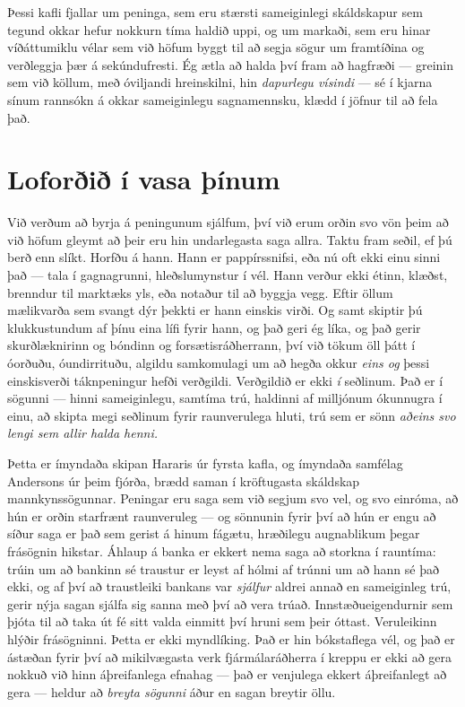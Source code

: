 Þessi kafli fjallar um peninga, sem eru stærsti sameiginlegi skáldskapur sem tegund okkar hefur nokkurn tíma haldið uppi, og um markaði, sem eru hinar víðáttumiklu vélar sem við höfum byggt til að segja sögur um framtíðina og verðleggja þær á sekúndufresti. Ég ætla að halda því fram að hagfræði — greinin sem við köllum, með óviljandi hreinskilni, hin \emph{dapurlegu vísindi} — sé í kjarna sínum rannsókn á okkar sameiginlegu sagnamennsku, klædd í jöfnur til að fela það.

\section*{Loforðið í vasa þínum}

Við verðum að byrja á peningunum sjálfum, því við erum orðin svo vön þeim að við höfum gleymt að þeir eru hin undarlegasta saga allra. Taktu fram seðil, ef þú berð enn slíkt. Horfðu á hann. Hann er pappírssnifsi, eða nú oft ekki einu sinni það — tala í gagnagrunni, hleðslumynstur í vél. Hann verður ekki étinn, klæðst, brenndur til marktæks yls, eða notaður til að byggja vegg. Eftir öllum mælikvarða sem svangt dýr þekkti er hann einskis virði. Og samt skiptir þú klukkustundum af þínu eina lífi fyrir hann, og það geri ég líka, og það gerir skurðlæknirinn og bóndinn og forsætisráðherrann, því við tökum öll þátt í óorðuðu, óundirrituðu, algildu samkomulagi um að hegða okkur \emph{eins og} þessi einskisverði táknpeningur hefði verðgildi. Verðgildið er ekki \emph{í} seðlinum. Það er í sögunni — hinni sameiginlegu, samtíma trú, haldinni af milljónum ókunnugra í einu, að skipta megi seðlinum fyrir raunverulega hluti, trú sem er sönn \emph{aðeins svo lengi sem allir halda henni.}

Þetta er ímyndaða skipan Hararis úr fyrsta kafla, og ímyndaða samfélag Andersons úr þeim fjórða, brædd saman í kröftugasta skáldskap mannkynssögunnar. Peningar eru saga sem við segjum svo vel, og svo einróma, að hún er orðin starfrænt raunveruleg — og sönnunin fyrir því að hún er engu að síður saga er það sem gerist á hinum fágætu, hræðilegu augnablikum þegar frásögnin hikstar. Áhlaup á banka er ekkert nema saga að storkna í rauntíma: trúin um að bankinn sé traustur er leyst af hólmi af trúnni um að hann sé það ekki, og af því að traustleiki bankans var \emph{sjálfur} aldrei annað en sameiginleg trú, gerir nýja sagan sjálfa sig sanna með því að vera trúað. Innstæðueigendurnir sem þjóta til að taka út fé sitt valda einmitt því hruni sem þeir óttast. Veruleikinn hlýðir frásögninni. Þetta er ekki myndlíking. Það er hin bókstaflega vél, og það er ástæðan fyrir því að mikilvægasta verk fjármálaráðherra í kreppu er ekki að gera nokkuð við hinn áþreifanlega efnahag — það er venjulega ekkert áþreifanlegt að gera — heldur að \emph{breyta sögunni} áður en sagan breytir öllu.

